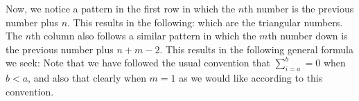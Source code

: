 \documentclass{article}
\begin{document}
{    Now, we notice a pattern in the first row in which the $n$th number is the previous number plus $n$.
    This results in the following:
    which are the triangular numbers.
    The $n$th column also follows a similar pattern in which the $m$th number down is the previous number plus $n + m - 2$.
    This results in the following general formula we seek:
    Note that we have followed the usual convention that $\sum_{i=a}^b = 0$ when $b < a$, and also that clearly
    when $m = 1$ as we would like according to this convention.
}
\end{document}
